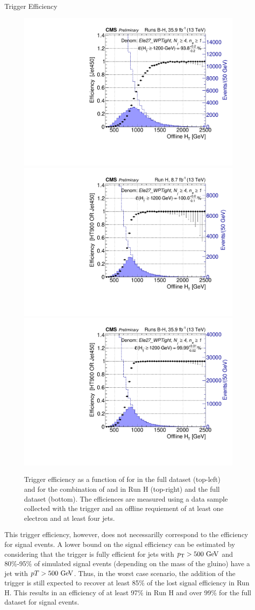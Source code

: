 \begin{section}{Trigger Efficiency}
\begin{figure}[tbp!]
\centering
\includegraphics[angle=0,width=0.45\columnwidth]{fig/trig_jet_runsbh.pdf}
\includegraphics[angle=0,width=0.45\columnwidth]{fig/trig_ht_jet_runh.pdf}
\includegraphics[angle=0,width=0.45\columnwidth]{fig/trig_ht_jet_runsbh.pdf}
\caption{Trigger efficiency as a function of \HT for \trigJet in the full dataset (top-left) and for the combination of \trigHT and \trigJet in Run H (top-right) and the full dataset (bottom).
The efficiences are measured using a data sample collected with the \trigEle trigger and an offline requiement of at least one electron and at least four jets.}
\label{fig:ht_jet_trigger}
\end{figure}

This trigger efficiency, however, does not necessarilly correspond to the efficiency for signal events.
A lower bound on the signal efficiency can be estimated by considering that the \trigJet trigger is fully efficient for jets with $p_{\mathrm{T}} > 500~\mathrm{Ge\kern -0.1em V}$ and 80\%-95\% of simulated signal events (depending on the mass of the gluino) have a jet with $pT > 500~\mathrm{Ge\kern -0.1em V}$.
Thus, in the worst case scenario, the addition of the \trigJet trigger is still expected to recover at least 85\% of the lost signal efficiency in Run H.
This results in an efficiency of at least 97\% in Run H and over 99\% for the full dataset for signal events.


\end{section}

